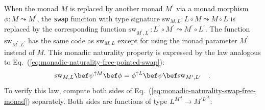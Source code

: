 When the monad $M$ is replaced by another monad $M^{\prime}$ via
a monad morphism $\phi:M\leadsto M^{\prime}$, the \lstinline!swap!
function with type signature $\text{sw}_{M,L}:L\circ M\leadsto M\circ L$
is replaced by the corresponding function $\text{sw}_{M^{\prime},L^{\prime}}:L^{\prime}\circ M^{\prime}\leadsto M^{\prime}\circ L^{\prime}$.
The function $\text{sw}_{M^{\prime},L^{\prime}}$ has the same code
as $\text{sw}_{M,L}$ except for using the monad parameter $M^{\prime}$
instead of $M$. This monadic naturality property is expressed by
the law analogous to Eq.~(\ref{eq:monadic-naturality-free-pointed-swap}):
\begin{equation}
\text{sw}_{M,L}\bef\psi^{\uparrow M}\bef\phi=\phi^{\uparrow L}\bef\psi\bef\text{sw}_{M^{\prime},L^{\prime}}\quad.\label{eq:monadic-naturality-swap-free-monad}
\end{equation}
To verify this law, compute both sides of Eq.~(\ref{eq:monadic-naturality-swap-free-monad})
separately. Both sides are functions of type $L^{M^{A}}\rightarrow M^{\prime L^{\prime A}}$:
